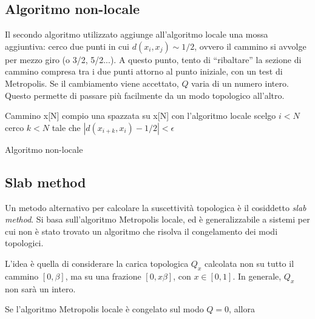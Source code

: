 \documentclass[a4paper,11pt]{article}
\begin{document}
    \subsection{Algoritmo non-locale}
    
    Il secondo algoritmo utilizzato aggiunge all'algoritmo locale una mossa aggiuntiva: cerco due punti in cui $d(x_i, x_j) \sim 1/2$, ovvero il cammino si avvolge per mezzo giro (o 3/2, 5/2...). A questo punto, tento di ``ribaltare'' la sezione di cammino compresa tra i due punti attorno al punto iniziale, con un test di Metropolis. Se il cambiamento viene accettato, $Q$ varia di un numero intero. Questo permette di passare più facilmente da un modo topologico all'altro.

    \begin{algorithm}[H]
    Cammino x[N]\;
    compio una spazzata su x[N] con l'algoritmo locale\;
    scelgo $i < N$\;
    cerco $k < N$ tale che $| d(x_{i+k}, x_i) - 1/2| < \epsilon$\;
    \caption{Algoritmo non-locale}
    \label{alg:tailor}
    \end{algorithm}
    

    \subsection{Slab method}
    
    Un metodo alternativo per calcolare la suscettività topologica è il cosiddetto \emph{slab method}. Si basa sull'algoritmo Metropolis locale, ed è generalizzabile a sistemi per cui non è stato trovato un algoritmo che risolva il congelamento dei modi topologici.
    
    L'idea è quella di considerare la carica topologica $Q_x$ calcolata non su tutto il cammino $[0, \beta]$, ma su una frazione $[0, x\beta]$, con $x \in [0,1]$. In generale, $Q_x$ non sarà un intero.
    
    Se l'algoritmo Metropolis locale è congelato sul modo $Q = 0$, allora 
    
\end{document}
